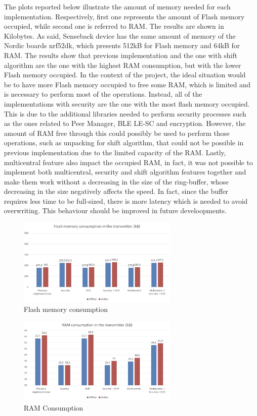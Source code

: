 \documentclass{Configuration_Files/PoliMi3i_thesis}
\begin{document}
The plots reported below illustrate the amount of memory needed for each implementation. Respectively, first one represents the amount of Flash memory occupied, while second one is referred to RAM. The results are shown in Kilobytes. As said, Senseback device has the same amount of memory of the Nordic boards nrf52dk, which presents 512kB for Flash memory and 64kB for RAM. The results show that previous implementation and the one with shift algorithm are the one with the highest RAM consumption, but with the lower Flash memory occupied. In the context of the project, the ideal situation would be to have more Flash memory occupied to free some RAM, which is limited and is necessary to perform most of the operations. Instead, all of the implementations with security are the one with the most flash memory occupied. This is due to the additional libraries needed to perform security processes such as the ones related to Peer Manager, BLE LE-SC and encryption. However, the amount of RAM free through this could possibly be used to perform those operations, such as unpacking for shift algorithm, that could not be possible in previous implementation due to the limited capacity of the RAM. Lastly, multicentral feature also impact the occupied RAM, in fact, it was not possible to implement both multicentral, security and shift algorithm features together and make them work without a decreasing in the size of the ring-buffer, whose decreasing in the size negatively affects the speed. In fact, since the buffer requires less time to be full-sized, there is more latency which is needed to avoid overwriting. This behaviour should be improved in future develoopments.
\begin{figure}[H]
    \centering
    \includegraphics[width=0.7\textwidth]{Screenshot 2024-09-18 at 14.34.42.png}
    \caption{Flash memory consumption}
    \label{flashmem}
\end{figure}


\begin{figure}[H]
    \centering
    \includegraphics[width=0.7\textwidth]{Screenshot 2024-09-18 at 14.34.49.png}
    \caption{RAM Consumption}
    \label{rammem}
\end{figure}
\end{document}

